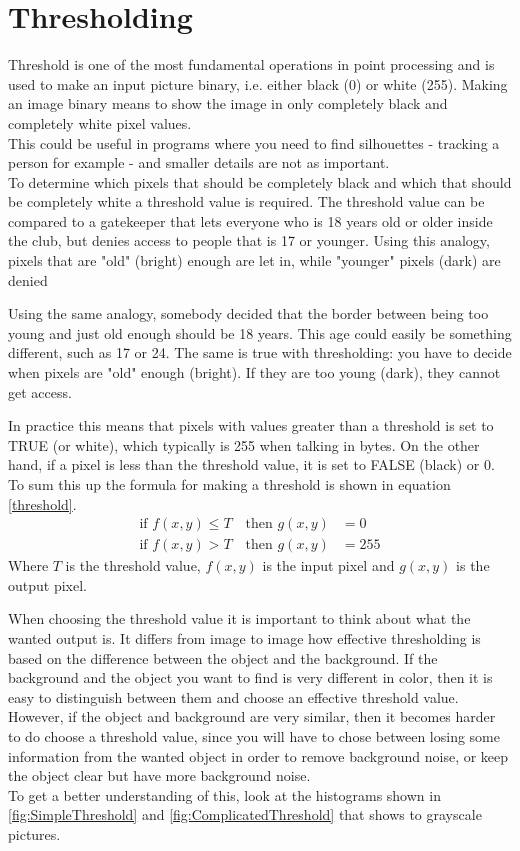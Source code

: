 \section{Thresholding}
\label{sec:Thresholding}
Threshold is one of the most fundamental operations in point processing  and is used to make an input picture binary, i.e. either black (0) or white (255). Making an image binary means to show the image in only completely black and completely white pixel values. \\
This could be useful in programs where you need to find silhouettes - tracking a person for example - and smaller details are not as important. \\
To determine which pixels that should be completely black and which that should be completely white a threshold value is required. The threshold value can be compared to a gatekeeper that lets everyone who is 18 years old or older inside the club, but denies access to people that is 17 or younger. Using this analogy, pixels that are "old" (bright) enough are let in, while "younger" pixels (dark) are denied

Using the same analogy, somebody decided that the border between being too young and just old enough should be 18 years. This age could easily be something different, such as 17 or 24. The same is true with thresholding: you have to decide when pixels are "old" enough (bright). If they are too young (dark), they cannot get access.

In practice this means that pixels with values greater than a threshold is set to TRUE (or white), which typically is 255 when talking in bytes. On the other hand, if a pixel is less than the threshold value, it is set to FALSE (black) or 0. To sum this up the formula for making a threshold is shown in equation \ref{threshold}.
\begin{equation}
  \begin{aligned}
  	\text{if } f(x,y)\leq T \quad \text{then } g(x,y)&= 0 \\
  	\text{if } f(x,y)>T \quad \text{then } g(x,y)&= 255
	\label{threshold}  
  \end{aligned} 
\end{equation}
Where $T$ is the threshold value, $f(x,y)$ is the input pixel and $g(x,y)$ is the output pixel. 

When choosing the threshold value it is important to think about what the wanted output is. It differs  from image to image how effective thresholding is based on the difference between the object and the background. If the background and the object you want to find is very different in color, then it is easy to distinguish between them and choose an effective threshold value. However, if the object and background are very similar, then it becomes harder to do choose a threshold value, since you will have to chose between losing some information from the wanted object in order to remove background noise, or keep the object clear but have more background noise. \\
To get a better understanding of this, look at the histograms shown in \eqref{fig:SimpleThreshold} and \eqref{fig:ComplicatedThreshold} that shows to grayscale pictures.

